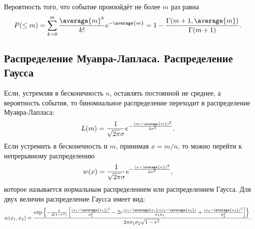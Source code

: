    Вероятность того, что событие произойдёт не более \( m \) раз равна
    \[
        P(\le m) = \sum_{k=0}^m \frac{\average{m}^k}{k!}e^{-\average{m}} =
        1 - \frac{\Gamma(m+1, \average{m})}{\Gamma(m+1)}.
    \]

\subsection{Распределение Муавра-Лапласа. Распределение Гаусса}
    Если, устремляя в бесконечность \( n \), оставлять постоянной не среднее, а
    вероятность события, то биномиальное распределение переходит в распределение
    Муавра-Лапласа:
    \[
        L(m) = \frac{1}{\sqrt{2\pi}\sigma}
            e^{-\frac{\left(m-\average{m}\right)^2}{2\sigma^2}}.
    \]
    Если устремить в бесконечность и \( m \), принимая \( x = m / n \), то можно
    перейти к непрерывному распределению
    \[
        w(x) = \frac{1}{\sqrt{2\pi}\sigma}
            e^{-\frac{\left(x-\average{x}\right)^2}{2\sigma^2}},
    \]
    которое называется нормальным распределением или распределением Гаусса.
    Для двух величин распределение Гаусса имеет вид:
    \[
        w(x_1, x_2) = \frac{
            \exp\left\{-\frac{1}{2(1-r^2)}\left[
                \frac{(x_1 - \average{x_1})^2}{\sigma_1^2} -
                2r\frac{(x_1 - \average{x_1})(x_2 - \average{x_2})}
                    {\sigma_1\sigma_2} +
                \frac{(x_2 - \average{x_2})^2}{\sigma_2^2}
            \right]\right\}
            }{2\pi\sigma_1\sigma_2\sqrt{1 - r^2}}.
    \]

